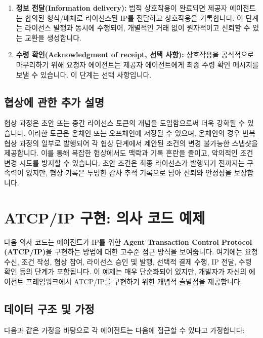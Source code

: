 \documentclass[journal,onecolumn]{IEEEtran} %
\begin{document}
\begin{enumerate}
    \item \textbf{정보 전달(Information delivery):} 법적 상호작용이 완료되면 제공자 에이전트는 합의된 형식/매체로 라이선스된 IP를 전달하고 상호작용을 기록합니다. 이 단계는 라이선스 발행과 동시에 수행되어, 개별적인 거래 없이 원자적이고 신뢰할 수 있는 교환을 생성합니다.

    \item \textbf{수령 확인(Acknowledgment of receipt, 선택 사항):} 상호작용을 공식적으로 마무리하기 위해 요청자 에이전트는 제공자 에이전트에게 최종 수령 확인 메시지를 보낼 수 있습니다. 이 단계는 선택 사항입니다.
\end{enumerate}

\subsection{협상에 관한 추가 설명}
협상 과정은 초안 또는 중간 라이선스 토큰의 개념을 도입함으로써 더욱 강화될 수 있습니다. 이러한 토큰은 온체인 또는 오프체인에 저장될 수 있으며, 온체인의 경우 반복 협상 과정의 일부로 발행되어 각 협상 단계에서 제안된 조건의 변경 불가능한 스냅샷을 제공합니다. 이를 통해 복잡한 협상에서도 맥락과 기록 혼란을 줄이고, 악의적인 조건 변경 시도를 방지할 수 있습니다. 초안 조건은 최종 라이선스가 발행되기 전까지는 구속력이 없지만, 협상 기록은 투명한 감사 추적 기록으로 남아 신뢰와 안정성을 보장합니다.

\section{ATCP/IP 구현: 의사 코드 예제}

다음 의사 코드는 에이전트가 IP를 위한 \textbf{Agent Transaction Control Protocol (ATCP/IP)}을 구현하는 방법에 대한 고수준 접근 방식을 보여줍니다. 여기에는 요청 수신, 조건 작성, 협상 참여, 라이선스 승인 및 발행, 선택적 결제 수행, IP 전달, 수령 확인 등의 단계가 포함됩니다. 이 예제는 매우 단순화되어 있지만, 개발자가 자신의 에이전트 프레임워크에서 ATCP/IP를 구현하기 위한 개념적 출발점을 제공합니다.

\subsection{데이터 구조 및 가정}

다음과 같은 가정을 바탕으로 각 에이전트는 다음에 접근할 수 있다고 가정합니다:
\end{document}
